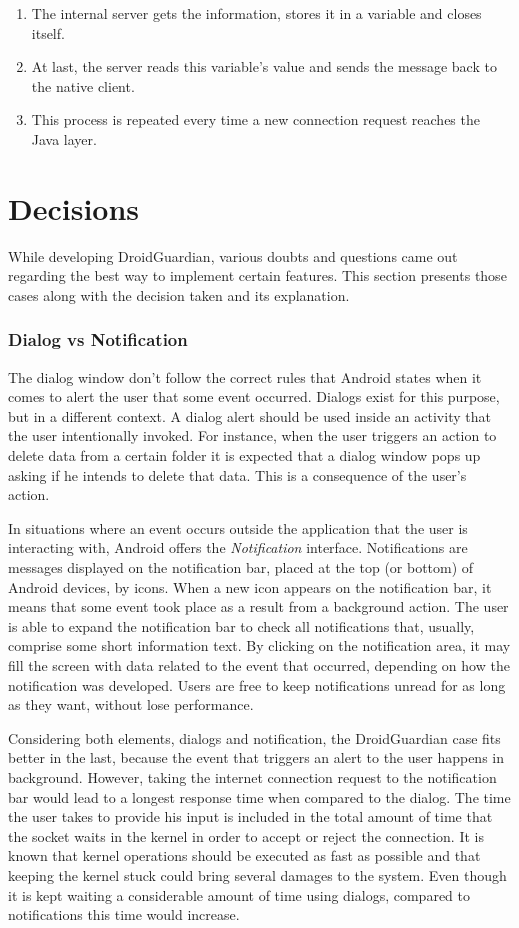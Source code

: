 \begin{enumerate}
\item The internal server gets the information, stores it in a variable and closes itself.
\item At last, the server reads this variable's value and sends the message back to the native client.
\item This process is repeated every time a new connection request reaches the Java layer.
\end{enumerate} 

\section{Decisions}

While developing DroidGuardian, various doubts and questions came out regarding the best way to implement certain features. This section presents those cases along with the decision taken and its explanation.

\subsubsection{Dialog vs Notification}

The dialog window don't follow the correct rules that Android states when it comes to alert the user that some event occurred. Dialogs exist for this purpose, but in a different context. A dialog alert should be used inside an activity that the user intentionally invoked. For instance, when the user triggers an action to delete data from a certain folder it is expected that a dialog window pops up asking if he intends to delete that data. This is a consequence of the user's action.

In situations where an event occurs outside the application that the user is interacting with, Android offers the \textit{Notification} interface. Notifications are messages displayed on the notification bar, placed at the top (or bottom) of Android devices, by icons. When a new icon appears on the notification bar, it means that some event took place as a result from a background action. The user is able to expand the notification bar to check all notifications that, usually, comprise some short information text. By clicking on the notification area, it may fill the screen with data related to the event that occurred, depending on how the notification was developed. Users are free to keep notifications unread for as long as they want, without lose performance.

Considering both elements, dialogs and notification, the DroidGuardian case fits better in the last, because the event that triggers an alert to the user happens in background. However, taking the internet connection request to the notification bar would lead to a longest response time when compared to the dialog. The time the user takes to provide his input is included in the total amount of time that the socket waits in the kernel in order to accept or reject the connection. It is known that kernel operations should be executed as fast as possible and that keeping the kernel stuck could bring several damages to the system. Even though it is kept waiting a considerable amount of time using dialogs, compared to notifications this time would increase. 

